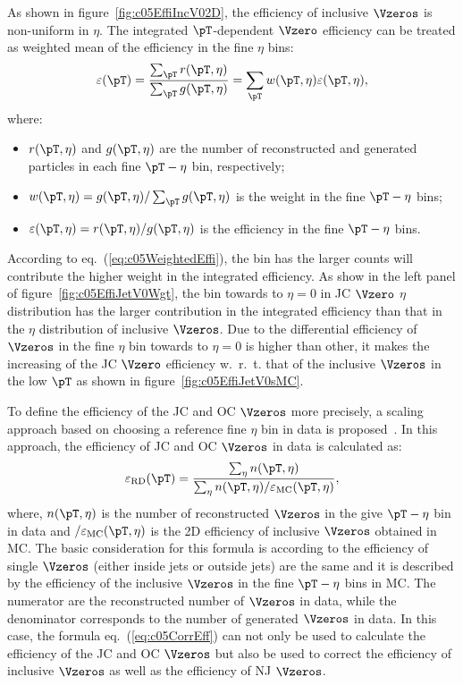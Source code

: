 As shown in figure~\ref{fig:c05EffiIncV02D},
the efficiency of inclusive $\Vzeros$ is non-uniform in $\eta$.
The integrated $\pT$-dependent $\Vzero$ efficiency can be treated as
weighted mean of the efficiency in the fine $\eta$ bins:
\begin{equation}\label{eq:c05WeightedEffi}
\varepsilon(\pT)=\frac{\sum_{\pT}r(\pT,\eta)}
                      {\sum_{\pT}g(\pT,\eta)}
 =\sum_{\pT}w(\pT,\eta)\varepsilon(\pT,\eta),
\end{equation}
where:
\begin{itemize}
\item $r(\pT,\eta)$ and $g(\pT,\eta)$ are the number of reconstructed and
      generated particles in each fine $\pT-\eta$ bin, respectively;
\item $w(\pT,\eta)=g(\pT,\eta)/\sum_{\pT}g(\pT,\eta)$ is the weight in the
      fine $\pT-\eta$ bins;
\item $\varepsilon(\pT,\eta)=r(\pT,\eta)/g(\pT,\eta)$ is the efficiency
      in the fine $\pT-\eta$ bins.
\end{itemize}
According to eq.~(\ref{eq:c05WeightedEffi}),
the bin has the larger counts will contribute the higher weight in the
integrated efficiency.
As show in the left panel of figure~\ref{fig:c05EffiJetV0Wgt},
the bin towards to $\eta=0$ in JC $\Vzero$ $\eta$ distribution has the
larger contribution in the integrated efficiency than that in the $\eta$
distribution of inclusive $\Vzeros$.
Due to the differential efficiency of $\Vzeros$ in the fine $\eta$ bin
towards to $\eta=0$ is higher than other,
it makes the increasing of the JC $\Vzero$ efficiency w.~r.~t. that of
the inclusive $\Vzeros$ in the low $\pT$
as shown in figure~\ref{fig:c05EffiJetV0sMC}.

To define the efficiency of the JC and OC $\Vzeros$ more precisely,
a scaling approach based on choosing a reference fine $\eta$ bin in data is
proposed~\cite{Zimmermann:AliPWGJE20140411}.
In this approach, the efficiency of JC and OC $\Vzeros$ in data is
calculated as:
\begin{equation}\label{eq:c05CorrEff}
\varepsilon_{\rm RD}(\pT)=
\frac{\sum_{\eta}n(\pT,\eta)}
     {\sum_{\eta}n(\pT,\eta)/\varepsilon_{\rm MC}(\pT,\eta)},
\end{equation}
where, $n(\pT,\eta)$ is the number of reconstructed $\Vzeros$ in the give
$\pT-\eta$ bin in data and $/\varepsilon_{\rm MC}(\pT,\eta)$ is the 2D
efficiency of inclusive $\Vzeros$ obtained in MC.
The basic consideration for this formula is according to the
efficiency of single $\Vzeros$ (either inside jets or outside jets) are the
same and it is described by the efficiency of the inclusive $\Vzeros$ in the
fine $\pT-\eta$ bins in MC.
The numerator are the reconstructed number of $\Vzeros$ in data,
while the denominator corresponds to the number of generated $\Vzeros$ in data.
In this case, the formula eq.~(\ref{eq:c05CorrEff}) can not only be used to
calculate the efficiency of the JC and OC $\Vzeros$ but also be used to
correct the efficiency of inclusive $\Vzeros$ as well as the efficiency
of NJ $\Vzeros$.

